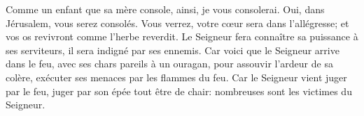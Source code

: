 Comme un enfant que sa mère console, ainsi, je vous consolerai.
	Oui, dans Jérusalem, vous serez consolés.
Vous verrez, votre cœur sera dans l’allégresse;
	et vos os revivront comme l’herbe reverdit.
Le Seigneur fera connaître sa puissance à ses serviteurs,
	il sera indigné par ses ennemis.
Car voici que le Seigneur arrive dans le feu, avec ses chars pareils à un ouragan,
	pour assouvir l’ardeur de sa colère, exécuter ses menaces par les flammes du feu.
Car le Seigneur vient juger par le feu, juger par son épée tout être de chair:
	nombreuses sont les victimes du Seigneur.
